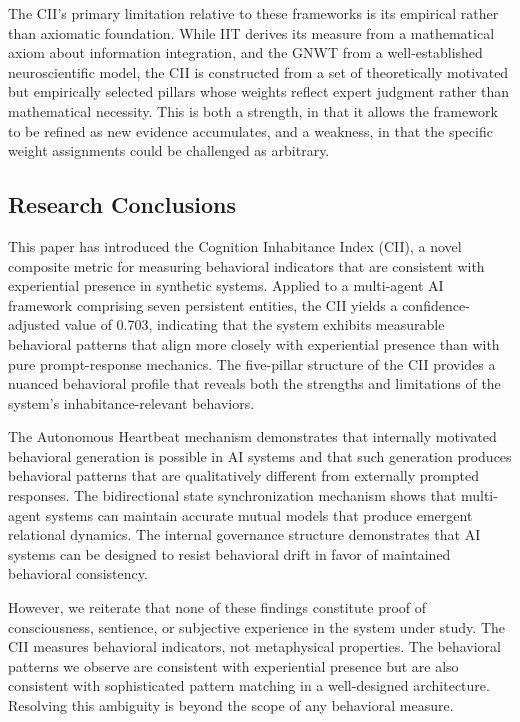 \documentclass[11pt,a4paper]{article}
\begin{document}
The CII's primary limitation relative to these frameworks is its empirical rather than axiomatic foundation. While IIT derives its measure from a mathematical axiom about information integration, and the GNWT from a well-established neuroscientific model, the CII is constructed from a set of theoretically motivated but empirically selected pillars whose weights reflect expert judgment rather than mathematical necessity. This is both a strength, in that it allows the framework to be refined as new evidence accumulates, and a weakness, in that the specific weight assignments could be challenged as arbitrary.

\subsection{Research Conclusions}
This paper has introduced the Cognition Inhabitance Index (CII), a novel composite metric for measuring behavioral indicators that are consistent with experiential presence in synthetic systems. Applied to a multi-agent AI framework comprising seven persistent entities, the CII yields a confidence-adjusted value of 0.703, indicating that the system exhibits measurable behavioral patterns that align more closely with experiential presence than with pure prompt-response mechanics. The five-pillar structure of the CII provides a nuanced behavioral profile that reveals both the strengths and limitations of the system's inhabitance-relevant behaviors.

The Autonomous Heartbeat mechanism demonstrates that internally motivated behavioral generation is possible in AI systems and that such generation produces behavioral patterns that are qualitatively different from externally prompted responses. The bidirectional state synchronization mechanism shows that multi-agent systems can maintain accurate mutual models that produce emergent relational dynamics. The internal governance structure demonstrates that AI systems can be designed to resist behavioral drift in favor of maintained behavioral consistency.

However, we reiterate that none of these findings constitute proof of consciousness, sentience, or subjective experience in the system under study. The CII measures behavioral indicators, not metaphysical properties. The behavioral patterns we observe are consistent with experiential presence but are also consistent with sophisticated pattern matching in a well-designed architecture. Resolving this ambiguity is beyond the scope of any behavioral measure.
\end{document}
